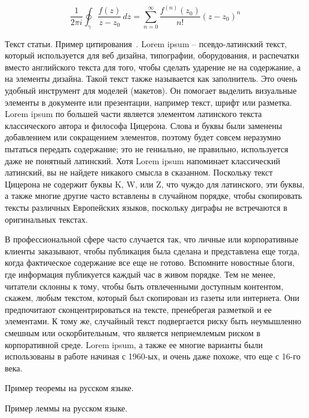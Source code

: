 \begin{equation}
    \frac{1}{2\pi i}\oint_{\gamma} \frac{f(z)}{z-z_0} \,dz = \sum_{n=0}^{\infty} \frac{f^{(n)}(z_0)}{n!}(z-z_0)^n\label{eq:equation}
\end{equation}

Текст статьи.
Пример цитирования~\cite{kolmogorov1950osnovnye, kolmogorov83kobminatorniye, GithubSource_2022, Sloane_theencyclopedia}.
Lorem ipsum – псевдо-латинский текст, который используется для веб дизайна, типографии, оборудования,
и распечатки вместо английского текста для того, чтобы сделать ударение не на содержание,
а на элементы дизайна.
Такой текст также называется как заполнитель.
Это очень удобный инструмент для моделей (макетов).
Он помогает выделить визуальные элементы в документе или презентации, например текст, шрифт или разметка.
Lorem ipsum по большей части является элементом латинского текста классического автора и философа Цицерона.
Слова и буквы были заменены добавлением или сокращением элементов, поэтому будет совсем неразумно пытаться передать содержание;
это не гениально, не правильно, используется даже не понятный латинский.
Хотя Lorem ipsum напоминает классический латинский, вы не найдете никакого смысла в сказанном.
Поскольку текст Цицерона не содержит буквы K, W, или Z, что чуждо для латинского, эти буквы, а также многие другие
часто вставлены в случайном порядке, чтобы скопировать тексты различных Европейских языков, поскольку диграфы
не встречаются в оригинальных текстах.

В профессиональной сфере часто случается так, что личные или корпоративные клиенты заказывают, чтобы публикация была
сделана и представлена еще тогда, когда фактическое содержание все еще не готово.
Вспомните новостные блоги, где информация публикуется каждый час в живом порядке.
Тем не менее, читатели склонны к тому, чтобы быть отвлеченными доступным контентом, скажем, любым текстом, который
был скопирован из газеты или интернета.
Они предпочитают сконцентрироваться на тексте, пренебрегая разметкой и ее элементами.
К тому же, случайный текст подвергается риску быть неумышленно смешным или оскорбительным,
что является неприемлемым риском в корпоративной среде.
Lorem ipsum, а также ее многие варианты были использованы в работе начиная с 1960-ых, и очень даже похоже,
что еще с 16-го века.

\begin{thmrus}
    Пример теоремы на русском языке.
\end{thmrus}

\begin{lemrus}
    Пример леммы на русском языке.
\end{lemrus}

